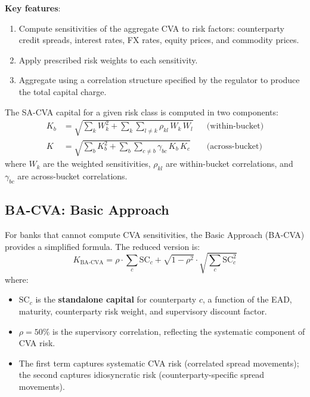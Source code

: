 \documentclass[11pt, a4paper]{article}
\theoremstyle{definition}
\theoremstyle{plain}
\theoremstyle{remark}
\begin{document}
\textbf{Key features}:
\begin{enumerate}
    \item Compute sensitivities of the aggregate CVA to risk factors:
          counterparty credit spreads, interest rates, FX rates, equity prices,
          and commodity prices.
    \item Apply prescribed risk weights to each sensitivity.
    \item Aggregate using a correlation structure specified by the regulator
          to produce the total capital charge.
\end{enumerate}

The SA-CVA capital for a given risk class is computed in two components:
\begin{align}
    K_b &= \sqrt{\sum_k W_k^2 + \sum_{k}\sum_{l \neq k} \rho_{kl}\, W_k\, W_l}
    && \text{(within-bucket)} \label{eq:sa-cva-bucket}\\
    K &= \sqrt{\sum_b K_b^2 + \sum_b \sum_{c \neq b} \gamma_{bc}\, K_b\, K_c}
    && \text{(across-bucket)} \label{eq:sa-cva-total}
\end{align}
where $W_k$ are the weighted sensitivities, $\rho_{kl}$ are within-bucket correlations,
and $\gamma_{bc}$ are across-bucket correlations.

\subsection{BA-CVA: Basic Approach}

For banks that cannot compute CVA sensitivities, the Basic Approach (BA-CVA)
provides a simplified formula.
The reduced version is:
\begin{equation}\label{eq:ba-cva}
    K_{\text{BA-CVA}} = \rho \cdot \sum_c \text{SC}_c
    + \sqrt{1 - \rho^2}\cdot\sqrt{\sum_c \text{SC}_c^2}
\end{equation}
where:
\begin{itemize}
    \item $\text{SC}_c$ is the \textbf{standalone capital} for counterparty $c$,
          a function of the EAD, maturity, counterparty risk weight, and supervisory
          discount factor.
    \item $\rho = 50\%$ is the supervisory correlation, reflecting the systematic
          component of CVA risk.
    \item The first term captures systematic CVA risk (correlated spread movements);
          the second captures idiosyncratic risk (counterparty-specific spread movements).
\end{itemize}
\end{document}
